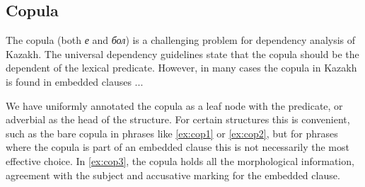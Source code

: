 \documentclass[a4paper,11pt, onecolumn,twoside]{article}
\begin{document}
\subsection{Copula}

The copula (both \emph{е} and \emph{бол}) is a challenging problem for dependency 
analysis of Kazakh. The universal dependency guidelines state that the copula should
be the dependent of the lexical predicate. However, in many cases the copula in Kazakh
is found in embedded clauses ...

We have uniformly annotated the copula as a leaf node with the predicate, or adverbial
as the head of the structure. For certain structures this is convenient, such as the
bare copula in phrases like \ref{ex:cop1} or \ref{ex:cop2}, but for phrases where
the copula is part of an embedded clause this is not necessarily the most  
effective choice. In \ref{ex:cop3}, the copula holds all the morphological information,
agreement with the subject and accusative marking for the embedded clause.
\end{document}

